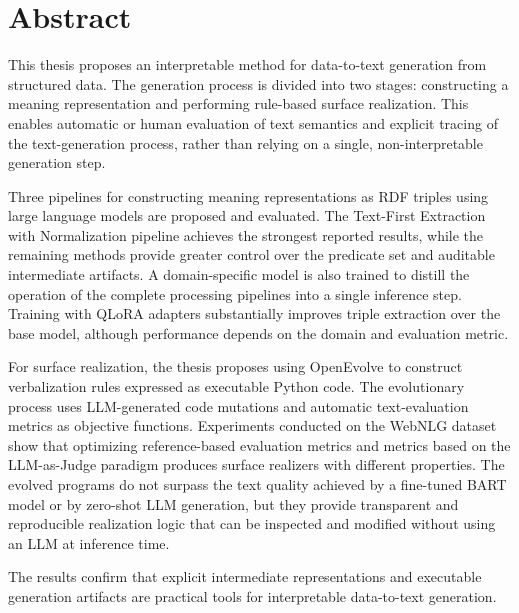 \chapter*{Abstract}

This thesis proposes an interpretable method for data-to-text generation from structured data. The generation process is divided into two stages: constructing a meaning representation and performing rule-based surface realization. This enables automatic or human evaluation of text semantics and explicit tracing of the text-generation process, rather than relying on a single, non-interpretable generation step.

Three pipelines for constructing meaning representations as RDF triples using large language models are proposed and evaluated. The Text-First Extraction with Normalization pipeline achieves the strongest reported results, while the remaining methods provide greater control over the predicate set and auditable intermediate artifacts. A domain-specific model is also trained to distill the operation of the complete processing pipelines into a single inference step. Training with QLoRA adapters substantially improves triple extraction over the base model, although performance depends on the domain and evaluation metric.

For surface realization, the thesis proposes using OpenEvolve to construct verbalization rules expressed as executable Python code. The evolutionary process uses LLM-generated code mutations and automatic text-evaluation metrics as objective functions. Experiments conducted on the WebNLG dataset show that optimizing reference-based evaluation metrics and metrics based on the LLM-as-Judge paradigm produces surface realizers with different properties. The evolved programs do not surpass the text quality achieved by a fine-tuned BART model or by zero-shot LLM generation, but they provide transparent and reproducible realization logic that can be inspected and modified without using an LLM at inference time.

The results confirm that explicit intermediate representations and executable generation artifacts are practical tools for interpretable data-to-text generation.
